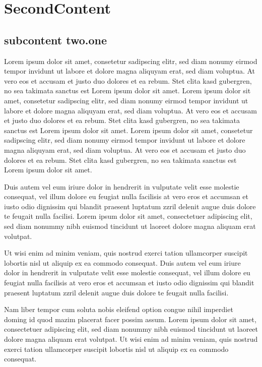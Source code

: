  
\clearpage 
\section{SecondContent}
 \subsection{subcontent two.one}   

Lorem ipsum dolor sit amet, consetetur sadipscing elitr, sed diam nonumy eirmod
tempor invidunt ut labore et dolore magna aliquyam erat, sed diam voluptua. At
vero eos et accusam et justo duo dolores et ea rebum. Stet clita kasd gubergren,
no sea takimata sanctus est Lorem ipsum dolor sit amet. Lorem ipsum dolor sit
amet, consetetur sadipscing elitr, sed diam nonumy eirmod tempor invidunt ut
labore et dolore magna aliquyam erat, sed diam voluptua. At vero eos et accusam
et justo duo dolores et ea rebum. Stet clita kasd gubergren, no sea takimata
sanctus est Lorem ipsum dolor sit amet. Lorem ipsum dolor sit amet, consetetur
sadipscing elitr, sed diam nonumy eirmod tempor invidunt ut labore et dolore
magna aliquyam erat, sed diam voluptua. At vero eos et accusam et justo duo
dolores et ea rebum. Stet clita kasd gubergren, no sea takimata sanctus est
Lorem ipsum dolor sit amet.

Duis autem vel eum iriure dolor in hendrerit in vulputate velit esse molestie
consequat, vel illum dolore eu feugiat nulla facilisis at vero eros et accumsan
et iusto odio dignissim qui blandit praesent luptatum zzril delenit augue duis
dolore te feugait nulla facilisi. Lorem ipsum dolor sit amet, consectetuer
adipiscing elit, sed diam nonummy nibh euismod tincidunt ut laoreet dolore magna
aliquam erat volutpat.

Ut wisi enim ad minim veniam, quis nostrud exerci tation ullamcorper suscipit
lobortis nisl ut aliquip ex ea commodo consequat. Duis autem vel eum iriure
dolor in hendrerit in vulputate velit esse molestie consequat, vel illum dolore
eu feugiat nulla facilisis at vero eros et accumsan et iusto odio dignissim qui
blandit praesent luptatum zzril delenit augue duis dolore te feugait nulla
facilisi.

Nam liber tempor cum soluta nobis eleifend option congue nihil imperdiet doming
id quod mazim placerat facer possim assum. Lorem ipsum dolor sit amet,
consectetuer adipiscing elit, sed diam nonummy nibh euismod tincidunt ut laoreet
dolore magna aliquam erat volutpat. Ut wisi enim ad minim veniam, quis nostrud
exerci tation ullamcorper suscipit lobortis nisl ut aliquip ex ea commodo
consequat.


